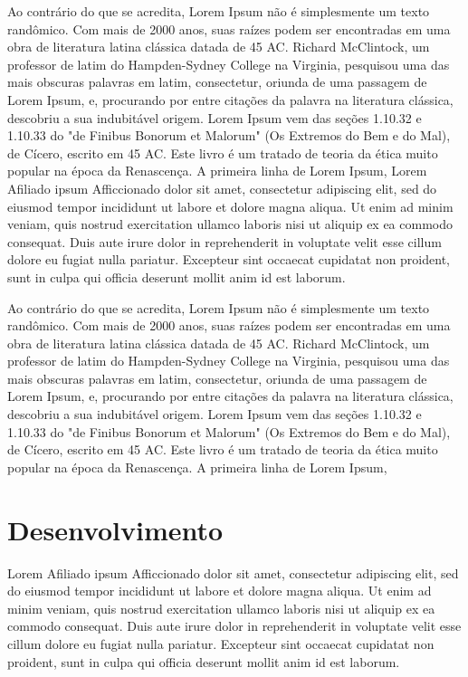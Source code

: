 \documentclass[a4, 12pt]{report}
\begin{document}
Ao contrário do que se acredita, Lorem Ipsum não é simplesmente um
texto randômico. Com mais de 2000 anos, suas raízes podem ser
encontradas em uma obra de literatura latina clássica datada de 45
AC. Richard McClintock, um professor de latim do Hampden-Sydney
College na Virginia, pesquisou uma das mais obscuras palavras em
latim, consectetur, oriunda de uma passagem de Lorem Ipsum, e,
procurando por entre citações da palavra na literatura clássica,
descobriu a sua indubitável origem. Lorem Ipsum vem das seções 1.10.32
e 1.10.33 do "de Finibus Bonorum et Malorum" (Os Extremos do Bem e do
Mal), de Cícero, escrito em 45 AC. Este livro é um tratado de teoria
da ética muito popular na época da Renascença. A primeira linha de
Lorem Ipsum,
Lorem Afiliado ipsum Afficcionado dolor sit amet, consectetur adipiscing elit, sed do eiusmod tempor incididunt ut labore et dolore magna aliqua. Ut enim ad minim veniam, quis nostrud exercitation ullamco laboris nisi ut aliquip ex ea commodo consequat. Duis aute irure dolor in reprehenderit in voluptate velit esse cillum dolore eu fugiat nulla pariatur. Excepteur sint occaecat cupidatat non proident, sunt in culpa qui officia deserunt mollit anim id est laborum.

Ao contrário do que se acredita, Lorem Ipsum não é simplesmente um
texto randômico. Com mais de 2000 anos, suas raízes podem ser
encontradas em uma obra de literatura latina clássica datada de 45
AC. Richard McClintock, um professor de latim do Hampden-Sydney
College na Virginia, pesquisou uma das mais obscuras palavras em
latim, consectetur, oriunda de uma passagem de Lorem Ipsum, e,
procurando por entre citações da palavra na literatura clássica,
descobriu a sua indubitável origem. Lorem Ipsum vem das seções 1.10.32
e 1.10.33 do "de Finibus Bonorum et Malorum" (Os Extremos do Bem e do
Mal), de Cícero, escrito em 45 AC. Este livro é um tratado de teoria
da ética muito popular na época da Renascença. A primeira linha de
Lorem Ipsum,

\chapter{Desenvolvimento}
\label{cha:desenvolvimento}
Lorem Afiliado ipsum Afficcionado dolor sit amet, consectetur adipiscing elit, sed do eiusmod tempor incididunt ut labore et dolore magna aliqua. Ut enim ad minim veniam, quis nostrud exercitation ullamco laboris nisi ut aliquip ex ea commodo consequat. Duis aute irure dolor in reprehenderit in voluptate velit esse cillum dolore eu fugiat nulla pariatur. Excepteur sint occaecat cupidatat non proident, sunt in culpa qui officia deserunt mollit anim id est laborum.
\end{document}
